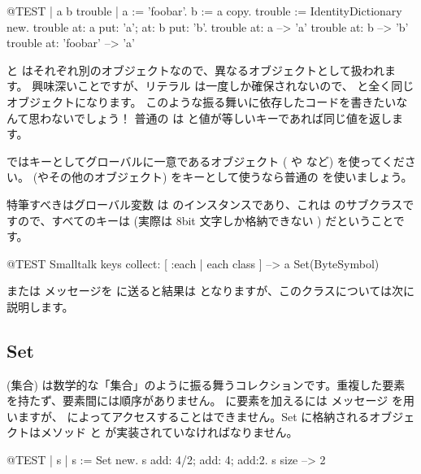 \documentclass[a4paper,10pt,twoside]{book}
\begin{document}
\begin{code}{@TEST | a b trouble |}
a := 'foobar'.
b := a copy.
trouble := IdentityDictionary new.
trouble at: a put: 'a'; at: b put: 'b'.
trouble at: a          --> 'a'
trouble at: b          --> 'b'
trouble at: 'foobar' --> 'a'
\end{code}

\noindent
{} と  はそれぞれ別のオブジェクトなので、異なるオブジェクトとして扱われます。
興味深いことですが、リテラル \mbox{} は一度しか確保されないので、 と全く同じオブジェクトになります。
このような振る舞いに依存したコードを書きたいなんて思わないでしょう！
普通の  は  と値が等しいキーであれば同じ値を返します。

 ではキーとしてグローバルに一意であるオブジェクト ( や  など) を使ってください。 (やその他のオブジェクト) をキーとして使うなら普通の  を使いましょう。

特筆すべきはグローバル変数  は  のインスタンスであり、これは  のサブクラスですので、すべてのキーは  (実際は 8bit 文字しか格納できない ) だということです。

\begin{code}{@TEST}
Smalltalk keys collect: [ :each | each class ] --> a Set(ByteSymbol)
\end{code}
\noindent
{} または  メッセージを  に送ると結果は  となりますが、このクラスについては次に説明します。

\subsection{Set}
 (集合) は数学的な「集合」のように振る舞うコレクションです。\ie 重複した要素を持たず、要素間には順序がありません。 に要素を加えるには  メッセージ を用いますが、 によってアクセスすることはできません。Set に格納されるオブジェクトはメソッド  と \ct{=} が実装されていなければなりません。

\begin{code}{@TEST | s | }
s := Set new.
s add: 4/2; add: 4; add:2.
s size --> 2
\end{code}
\end{document}
